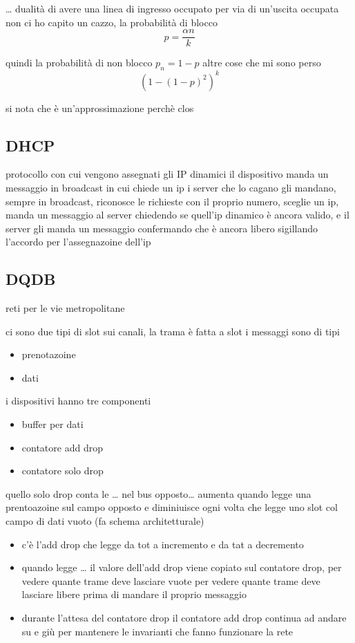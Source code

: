 \documentclass[11pt]{article}
\begin{document}
\ldots{} dualità di avere una linea di ingresso occupato per via di un'uscita occupata
non ci ho capito un cazzo, la probabilità di blocco
\[ p = \frac{\alpha n}{k} \]

quindi la probabilità di non blocco \(p_n = 1 - p\)
altre cose che mi sono perso
\[ {(1 - {(1 - p)}^2)}^k \]

si nota che è un'approssimazione perchè clos

\subsection{DHCP}
\label{sec:org539cd36}
protocollo con cui vengono assegnati gli IP dinamici
il dispositivo manda un messaggio in broadcast in cui chiede un ip
i server che lo cagano gli mandano, sempre in broadcast, riconosce le richieste con il proprio numero, sceglie un ip, manda un messaggio al server chiedendo se quell'ip dinamico è ancora valido, e il server gli manda un messaggio confermando che è ancora libero sigillando l'accordo per l'assegnazoine dell'ip

\subsection{DQDB}
\label{sec:org47de33b}
reti per le vie metropolitane

ci sono due tipi di slot sui canali, la trama è fatta a slot
i messaggi sono di tipi
\begin{itemize}
\item prenotazoine
\item dati
\end{itemize}

i dispositivi hanno tre componenti
\begin{itemize}
\item buffer per dati
\item contatore add drop
\item contatore solo drop
\end{itemize}

quello solo drop conta le \ldots{} nel bus opposto\ldots{} aumenta quando legge una prentoazoine sul campo opposto e diminiuisce ogni volta che legge uno slot col campo di dati vuoto
(fa schema architetturale)

\begin{itemize}
\item c'è l'add drop che legge da tot a incremento e da tat a decremento
\item quando legge \ldots{} il valore dell'add drop viene copiato sul contatore drop, per vedere quante trame deve lasciare vuote per vedere quante trame deve lasciare libere prima di mandare il proprio messaggio
\item durante l'attesa del contatore drop il contatore add drop continua ad andare su e giù per mantenere le invarianti che fanno funzionare la rete
\end{itemize}
\end{document}
